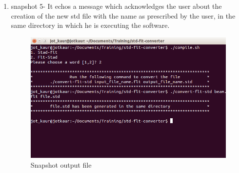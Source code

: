 \begin{enumerate}
\item snapshot 5- It echos a message which acknowledges the user about the creation of the new std file with the name as prescribed by the user, in the same directory in which he is executing the software.
\begin{figure} [h!]
\centering
\includegraphics[scale=0.3]{images/6.png}
\caption{Snapshot output file}
\end{figure}


\end{enumerate}



